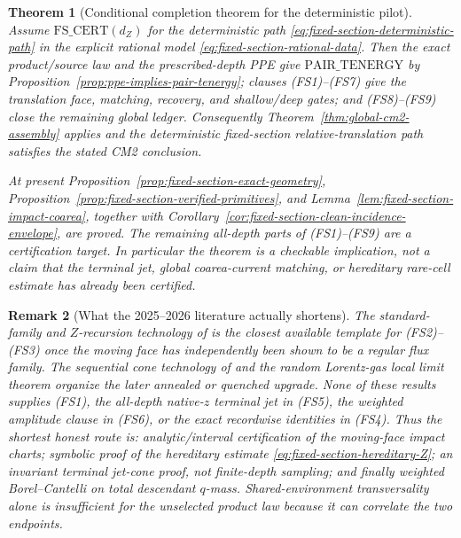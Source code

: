 \documentclass[11pt]{article}
\newtheorem{theorem}{Theorem}[section]
\newtheorem{remark}[theorem]{Remark}
\begin{document}
\begin{theorem}[Conditional completion theorem for the deterministic pilot]
\label{thm:fixed-section-nonvacuity-certificate}
Assume $\mathrm{FS\_CERT}(d_Z)$ for the deterministic path
\eqref{eq:fixed-section-deterministic-path} in the explicit rational model
\eqref{eq:fixed-section-rational-data}.  Then the exact product/source law
and the prescribed-depth PPE give $\mathrm{PAIR\_TENERGY}$ by
Proposition~\ref{prop:ppe-implies-pair-tenergy}; clauses
\textup{(FS1)--(FS7)} give the translation face, matching, recovery, and
shallow/deep gates; and \textup{(FS8)--(FS9)} close the remaining global
ledger.  Consequently Theorem~\ref{thm:global-cm2-assembly} applies and the
deterministic fixed-section relative-translation path satisfies the stated
CM2 conclusion.

At present Proposition~\ref{prop:fixed-section-exact-geometry},
Proposition~\ref{prop:fixed-section-verified-primitives}, and
Lemma~\ref{lem:fixed-section-impact-coarea}, together with
Corollary~\ref{cor:fixed-section-clean-incidence-envelope}, are proved.  The remaining
all-depth parts of \textup{(FS1)--(FS9)} are a certification target.  In
particular the theorem is a checkable implication, not a claim that the
terminal jet, global coarea-current matching, or hereditary rare-cell
estimate has already been certified.
\end{theorem}

\begin{remark}[What the 2025--2026 literature actually shortens]
\label{rem:fixed-section-latest-literature}
The standard-family and $Z$-recursion technology of
\cite{CanestrariHoles} is the closest available template for
\textup{(FS2)--(FS3)} once the moving face has independently been shown to
be a regular flux family.  The sequential cone technology of
\cite{DLcones} and the random Lorentz-gas local limit
theorem \cite{DemersPeneZhang} organize the later annealed or quenched
upgrade.  None of these results supplies \textup{(FS1)}, the all-depth
native-$z$ terminal jet in \textup{(FS5)}, the weighted amplitude clause in
\textup{(FS6)}, or the exact recordwise identities in \textup{(FS4)}.
Thus the shortest honest route is: analytic/interval certification of the
moving-face impact charts; symbolic proof of the hereditary estimate
\eqref{eq:fixed-section-hereditary-Z}; an invariant terminal jet-cone proof,
not finite-depth sampling; and finally weighted Borel--Cantelli on total
descendant $q$-mass.  Shared-environment transversality alone is insufficient
for the unselected product law because it can correlate the two endpoints.
\end{remark}
\end{document}

